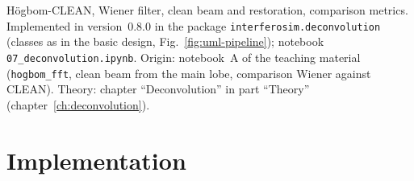 \label{ch:deconvolution-impl}

H\"ogbom-CLEAN, Wiener filter, clean beam and restoration, comparison
metrics. Implemented in version~0.8.0 in the package
\texttt{interferosim.deconvolution} (classes as in the basic design,
Fig.~\ref{fig:uml-pipeline}); notebook \texttt{07\_deconvolution.ipynb}.
Origin: notebook~A of the teaching material (\texttt{hogbom\_fft}, clean beam
from the main lobe, comparison Wiener against CLEAN). Theory: chapter
\enquote{Deconvolution} in part \enquote{Theory}
(chapter~\ref{ch:deconvolution}).

\section{Implementation}

